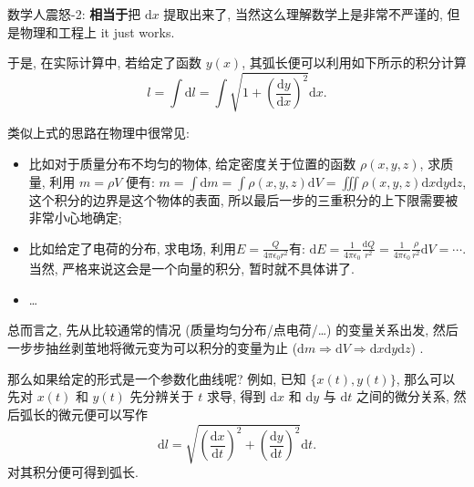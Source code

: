 \begin{newquote}
数学人震怒-2: \textbf{相当于}把 \(\mathrm{d}x\) 提取出来了,
当然这么理解数学上是非常不严谨的, 但是物理和工程上 it just works.
\end{newquote}

于是, 在实际计算中, 若给定了函数 \(y(x)\),
其弧长便可以利用如下所示的积分计算 \[
l=\int\mathrm{d}l=\int\sqrt{1+\left(\frac{\mathrm{d}y}{\mathrm{d}x}\right)^2}\mathrm{d}x.
\]

\begin{newquote}
类似上式的思路在物理中很常见:

\begin{itemize}
\tightlist
\item
  比如对于质量分布不均匀的物体, 给定密度关于位置的函数 \(\rho(x,y,z)\),
  求质量, 利用 \(m=\rho V\) 便有:
  \(m=\int\mathrm{d}m=\int\rho(x,y,z)\mathrm{d}V=\iiint\rho(x,y,z)\mathrm{d}x\mathrm{d}y\mathrm{d}z\),
  这个积分的边界是这个物体的表面,
  所以最后一步的三重积分的上下限需要被非常小心地确定;
\item
  比如给定了电荷的分布, 求电场,
  利用\(E=\frac{Q}{4\pi\epsilon_0 r^2}\)有:
  \(\mathrm{d}E=\frac{1}{4\pi\epsilon_0}\frac{\mathrm{d}Q}{r^2}=\frac{1}{4\pi\epsilon_0}\frac{\rho}{r^2}\mathrm{d}V=\cdots\).
  当然, 严格来说这会是一个向量的积分, 暂时就不具体讲了.
\item
  \ldots{}
\end{itemize}

总而言之, 先从比较通常的情况 (质量均匀分布/点电荷/\ldots)
的变量关系出发, 然后一步步抽丝剥茧地将微元变为可以积分的变量为止
(\(\mathrm{d}m\Rightarrow \mathrm{d}V\Rightarrow\mathrm{d}x\mathrm{d}y\mathrm{d}z\))
.
\end{newquote}

那么如果给定的形式是一个参数化曲线呢? 例如, 已知 \(\{x(t),y(t)\}\),
那么可以先对 \(x(t)\) 和 \(y(t)\) 先分辨关于 \(t\) 求导, 得到
\(\mathrm{d}x\) 和 \(\mathrm{d}y\) 与 \(\mathrm{d}t\) 之间的微分关系,
然后弧长的微元便可以写作 \[
\mathrm{d}l=\sqrt{\left(\frac{\mathrm{d}x}{\mathrm{d}t}\right)^2+\left(\frac{\mathrm{d}y}{\mathrm{d}t}\right)^2}\mathrm{d}t.
\] 对其积分便可得到弧长.
